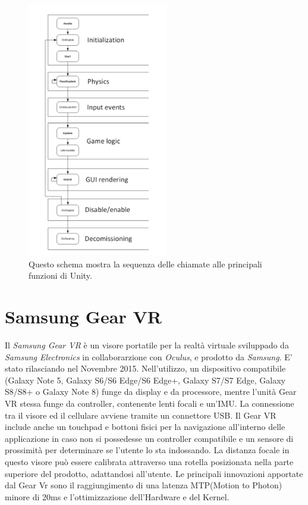 \begin{figure}[H]
	\includegraphics[width=0.55\textwidth]{figure/FunctionsScheme}
	\centering
	\caption{Questo schema mostra la sequenza delle chiamate alle principali funzioni di Unity.}
\end{figure}

\newpage
\section{Samsung Gear VR}

Il \textit{Samsung Gear VR} è un visore portatile  per la realtà virtuale sviluppado da \textit{Samsung Electronics} in collaborarzione con \textit{Oculus}, e prodotto da \textit{Samsung}. E' stato rilasciando nel Novembre 2015. Nell'utilizzo, un dispositivo compatibile (Galaxy Note 5, Galaxy S6/S6 Edge/S6 Edge+, Galaxy S7/S7 Edge, Galaxy S8/S8+ o Galaxy Note 8) funge da display e da processore, mentre l'unità Gear VR stessa funge da controller, contenente lenti focali e un'IMU. La connessione tra il visore ed il cellulare avviene tramite un connettore USB. Il Gear VR include anche un touchpad e bottoni fisici per la navigazione all'interno delle applicazione in caso non si possedesse un controller compatibile e un sensore di prossimità per determinare se l'utente lo sta indossando. La distanza focale in questo visore può essere calibrata attraverso una rotella posizionata nella parte superiore del prodotto, adattandosi all'utente. Le principali innovazioni apportate dal Gear Vr sono il raggiungimento di una latenza MTP(Motion to Photon) minore di 20ms e l'ottimizzazione dell'Hardware e del Kernel. \\

